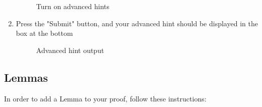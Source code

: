 \begin{enumerate}
	\begin{figure}[!ht]
		\centering
		\caption{Turn on advanced hints}
	\end{figure}
	
	\item Press the "Submit" button, and your advanced hint should be displayed in the box at the bottom
	
	\begin{figure}[!ht]
		\centering
		\caption{Advanced hint output}
	\end{figure}
	
\end{enumerate}


\subsection{Lemmas}

In order to add a Lemma to your proof, follow these instructions:

